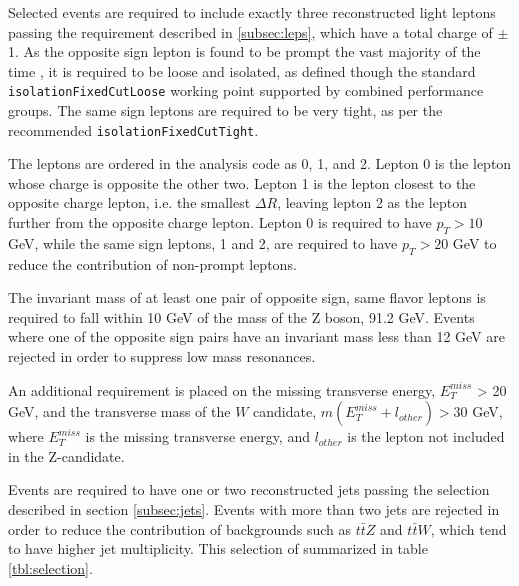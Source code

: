 
Selected events are required to include exactly three reconstructed light leptons passing the requirement described in \ref{subsec:leps}, which have a total charge of $\pm$1. As the opposite sign lepton is found to be prompt the vast majority of the time \cite{ttH_paper}, it is required to be loose and isolated, as defined though the standard \verb|isolationFixedCutLoose| working point supported by combined performance groups. The same sign leptons are required to be very tight, as per the recommended \verb|isolationFixedCutTight|.

The leptons are ordered in the analysis code as 0, 1, and 2. Lepton 0 is the lepton whose charge is opposite the other two. Lepton 1 is the lepton closest to the opposite charge lepton, i.e. the smallest $\Delta R$, leaving lepton 2 as the lepton further from the opposite charge lepton. Lepton 0 is required to have $p_T > 10$ GeV, while the same sign leptons, 1 and 2, are required to have $p_T > 20$ GeV to reduce the contribution of non-prompt leptons.  

The invariant mass of at least one pair of opposite sign, same flavor leptons is required to fall within 10 GeV of the mass of the Z boson, 91.2 GeV. Events where one of the opposite sign pairs have an invariant mass less than 12 GeV are rejected in order to suppress low mass resonances. %

An additional requirement is placed on the missing transverse energy, $E^{miss}_T$ > 20 GeV, and the transverse mass of the $W$ candidate, $m(E^{miss}_T + l_{other}) > 30$ GeV, where $E^{miss}_T$ is the missing transverse energy, and $l_{other}$ is the lepton not included in the Z-candidate. 

Events are required to have one or two reconstructed jets passing the selection described in section \ref{subsec:jets}. Events with more than two jets are rejected in order to reduce the contribution of backgrounds such as $t\bar{t}Z$ and $t\bar{t}W$, which tend to have higher jet multiplicity. This selection of summarized in table \ref{tbl:selection}.

